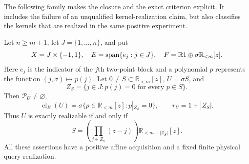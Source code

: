 The following family makes the closure and the exact criterion explicit.
It includes the failure of an unqualified kernel-realization claim, but
also classifies the kernels that are realized in the same positive
experiment.

\begin{proposition}
\label{prop:block-kernels}
Let $n\ge m+1$, let $J=\{1,\ldots,n\}$, and put
\[
 X=J\times\{-1,1\},\quad E=\operatorname{span}\{e_j:j\in J\},\quad
 F=\mathbb R1\oplus\sigma\mathbb R_{<m}[z].
\]
Here $e_j$ is the indicator of the $j$th two-point block and a polynomial
$p$ represents the function $(j,\sigma)\mapsto p(j)$. Let
$0\ne S\subset\mathbb R_{<m}[z]$, $U=\sigma S$, and
\[
 Z_S=\{j\in J:p(j)=0\text{ for every }p\in S\}.
\]
Then $\mathcal P_U\ne\varnothing$,
\begin{equation}\label{eq:block-kernel-classification}
 \operatorname{cl}_E(U)
   =\sigma\{p\in\mathbb R_{<m}[z]:p|_{Z_S}=0\},\qquad
 r_U=1+|Z_S|.
\end{equation}
Thus $U$ is exactly realizable if and only if
\begin{equation}\label{eq:block-root-condition}
 S=\left(\prod_{j\in Z_S}(z-j)\right)
                  \mathbb R_{<m-|Z_S|}[z].
\end{equation}
All these assertions have a positive affine acquisition and a fixed
finite physical query realization.
\end{proposition}
